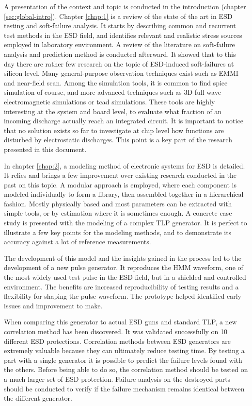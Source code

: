 A presentation of the context and topic is conducted in the introduction (chapter \ref{sec:global-intro}).
Chapter \ref{chap:1} is a review of the state of the art in ESD testing and soft-failure analysis.
It starts by describing common and recurrent test methods in the ESD field, and identifies relevant and realistic stress sources employed in laboratory environment.
A review of the literature on soft-failure analysis and prediction method is conducted afterward.
It showed that to this day there are rather few research on the topic of ESD-induced soft-failures at silicon level.
Many general-purpose observation techniques exist such as EMMI and near-field scan.
Among the simulation tools, it is common to find \gls{spice} simulation of course, and more advanced techniques such as 3D full-wave electromagnetic simulations or \gls{tcad} simulations.
These tools are highly interesting at the system and board level, to evaluate what fraction of an incoming discharge actually reach an integrated circuit.
It is important to notice that no solution exists so far to investigate at chip level how functions are disturbed by electrostatic discharges.
This point is a key part of the research presented in this document.

In chapter \ref{chap:2}, a modeling method of electronic systems for ESD is detailed.
It relies and brings a few improvement over existing research conducted in the past on this topic.
A modular approach is employed, where each component is modeled individually to form a library, then assembled together in a hierarchical fashion.
Mostly physically based and most parameters can be extracted with simple tools, or by estimation where it is sometimes enough.
A concrete case study is presented with the modeling of a complex TLP generator.
It is perfect to illustrate a few key points for the modeling methods, and to demonstrate its accuracy against a lot of reference measurements.

The development of this model and the insights gained in the process led to the development of a new pulse generator.
It reproduces the HMM waveform, one of the most widely used test pulse in the ESD field, but in a shielded and controlled environment.
The benefits are increased reproducibility of testing results and a flexibility for shaping the pulse waveform.
The prototype helped identified early issues and improvement to make.

When comparing this generator to actual ESD guns and standard TLP, a new correlation method has been discovered.
It was validated successfully on 10 different ESD protections.
Correlation methods between ESD generators are extremely valuable because they can ultimately reduce testing time.
By testing a part with a single generator it is possible to predict the failure levels found with the others.
Before being able to do so, the correlation method should be tested on a much larger set of ESD protection.
Failure analysis on the destroyed parts should be conducted to verify if the failure mechanism remains identical between the different generator.

